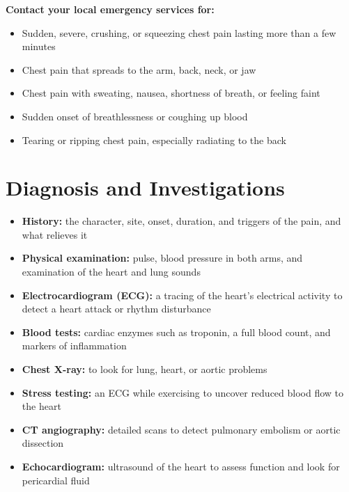 \medskip
\textbf{Contact your local emergency services for:}
\begin{itemize}
    \item Sudden, severe, crushing, or squeezing chest pain lasting more than a few minutes
    \item Chest pain that spreads to the arm, back, neck, or jaw
    \item Chest pain with sweating, nausea, shortness of breath, or feeling faint
    \item Sudden onset of breathlessness or coughing up blood
    \item Tearing or ripping chest pain, especially radiating to the back
\end{itemize}

\section*{Diagnosis and Investigations}
\begin{itemize}
    \item \textbf{History:} the character, site, onset, duration, and triggers of the pain, and what relieves it
    \item \textbf{Physical examination:} pulse, blood pressure in both arms, and examination of the heart and lung sounds
    \item \textbf{Electrocardiogram (ECG):} a tracing of the heart's electrical activity to detect a heart attack or rhythm disturbance
    \item \textbf{Blood tests:} cardiac enzymes such as troponin, a full blood count, and markers of inflammation
    \item \textbf{Chest X-ray:} to look for lung, heart, or aortic problems
    \item \textbf{Stress testing:} an ECG while exercising to uncover reduced blood flow to the heart
    \item \textbf{CT angiography:} detailed scans to detect pulmonary embolism or aortic dissection
    \item \textbf{Echocardiogram:} ultrasound of the heart to assess function and look for pericardial fluid
\end{itemize}

